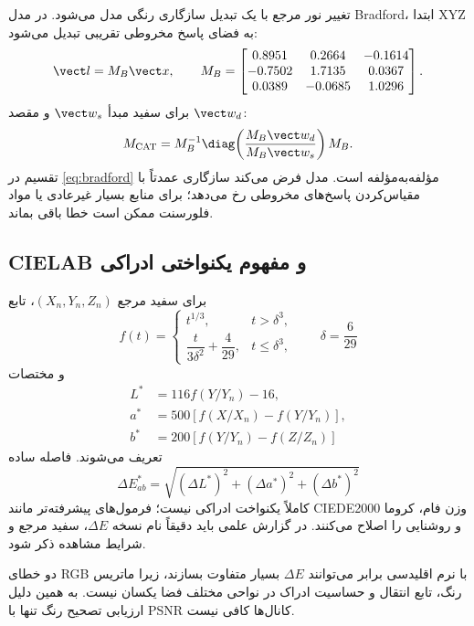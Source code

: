 تغییر نور مرجع با یک تبدیل سازگاری رنگی مدل می‌شود. در مدل Bradford، ابتدا XYZ به فضای پاسخ
مخروطی تقریبی تبدیل می‌شود:
\begin{equation}
\vect l=M_B\vect x,
\qquad
M_B=\begin{bmatrix}
0.8951&0.2664&-0.1614\\
-0.7502&1.7135&0.0367\\
0.0389&-0.0685&1.0296
\end{bmatrix}.
\end{equation}
برای سفید مبدأ \(\vect w_s\) و مقصد \(\vect w_d\):
\begin{equation}
M_{\mathrm{CAT}}=M_B^{-1}
\diag\!\left(\frac{M_B\vect w_d}{M_B\vect w_s}\right)M_B.
\label{eq:bradford}
\end{equation}
تقسیم در \eqref{eq:bradford} مؤلفه‌به‌مؤلفه است. مدل فرض می‌کند سازگاری عمدتاً با مقیاس‌کردن
پاسخ‌های مخروطی رخ می‌دهد؛ برای منابع بسیار غیرعادی یا مواد فلورسنت ممکن است خطا باقی بماند.

\subsection{CIELAB و مفهوم یکنواختی ادراکی}

برای سفید مرجع \((X_n,Y_n,Z_n)\)، تابع
\begin{equation}
f(t)=\begin{cases}
t^{1/3},&t>\delta^3,\\
\dfrac{t}{3\delta^2}+\dfrac{4}{29},&t\le\delta^3,
\end{cases}
\qquad \delta=\frac6{29}
\end{equation}
و مختصات
\begin{align}
L^*&=116f(Y/Y_n)-16,\\
a^*&=500[f(X/X_n)-f(Y/Y_n)],\\
b^*&=200[f(Y/Y_n)-f(Z/Z_n)]
\end{align}
تعریف می‌شوند. فاصله ساده
\begin{equation}
\Delta E_{ab}^*=\sqrt{(\Delta L^*)^2+(\Delta a^*)^2+(\Delta b^*)^2}
\end{equation}
کاملاً یکنواخت ادراکی نیست؛ فرمول‌های پیشرفته‌تر مانند CIEDE2000 وزن فام، کروما و روشنایی را
اصلاح می‌کنند. در گزارش علمی باید دقیقاً نام نسخه \(\Delta E\)، سفید مرجع و شرایط مشاهده ذکر شود.

\begin{example}
دو خطای RGB با نرم اقلیدسی برابر می‌توانند \(\Delta E\) بسیار متفاوت بسازند، زیرا ماتریس رنگ،
تابع انتقال و حساسیت ادراک در نواحی مختلف فضا یکسان نیست. به همین دلیل ارزیابی تصحیح رنگ تنها با
PSNR کانال‌ها کافی نیست.
\end{example}

